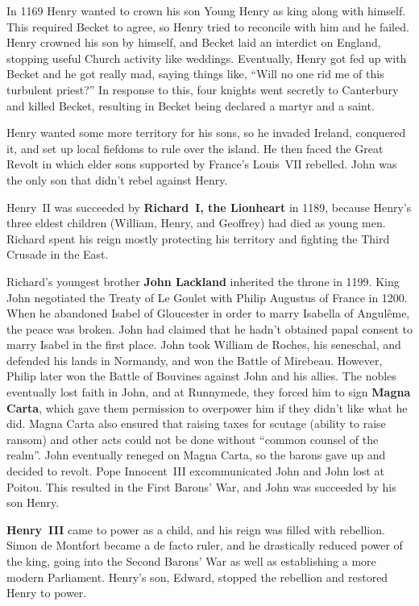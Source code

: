 In 1169 Henry wanted to crown his son Young Henry as king along with himself.
This required Becket to agree, so Henry tried to reconcile with him and he failed.
Henry crowned his son by himself, and Becket laid an interdict on England,
stopping useful Church activity like weddings.
Eventually, Henry got fed up with Becket and he got really mad, saying things like,
``Will no one rid me of this turbulent priest?''
In response to this, four knights went secretly to Canterbury and killed Becket,
resulting in Becket being declared a martyr and a saint.

Henry wanted some more territory for his sons, so he invaded Ireland, conquered it,
and set up local fiefdoms to rule over the island.
He then faced the Great Revolt in which elder sons supported by France's Louis~VII rebelled.
John was the only son that didn't rebel against Henry.

Henry~II was succeeded by \textbf{Richard~I, the Lionheart} in 1189,
because Henry's three eldest children (William, Henry, and Geoffrey) had died as young men.
Richard spent his reign mostly protecting his territory and fighting the Third Crusade in the East.

Richard's youngest brother \textbf{John Lackland} inherited the throne in 1199.
King John negotiated the Treaty of Le Goulet with Philip Augustus of France in 1200.
When he abandoned Isabel of Gloucester in order to marry Isabella of Angul\^eme, the peace was broken.
John had claimed that he hadn't obtained papal consent to marry Isabel in the first place.
John took William de Roches, his seneschal, and defended his lands in Normandy, and won the Battle of Mirebeau.
However, Philip later won the Battle of Bouvines against John and his allies.
The nobles eventually lost faith in John, and at Runnymede, they forced him to sign \textbf{Magna Carta},
which gave them permission to overpower him if they didn't like what he did.
Magna Carta also ensured that raising taxes for scutage (ability to raise ransom)
and other acts could not be done without ``common counsel of the realm''.
John eventually reneged on Magna Carta, so the barons gave up and decided to revolt.
Pope Innocent~III excommunicated John and John lost at Poitou.
This resulted in the First Barons' War, and John was succeeded by his son Henry.

\textbf{Henry~III} came to power as a child, and his reign was filled with rebellion.
Simon de Montfort became a de facto ruler, and he drastically reduced power of the king,
going into the Second Barons' War as well as establishing a more modern Parliament.
Henry's son, Edward, stopped the rebellion and restored Henry to power.

